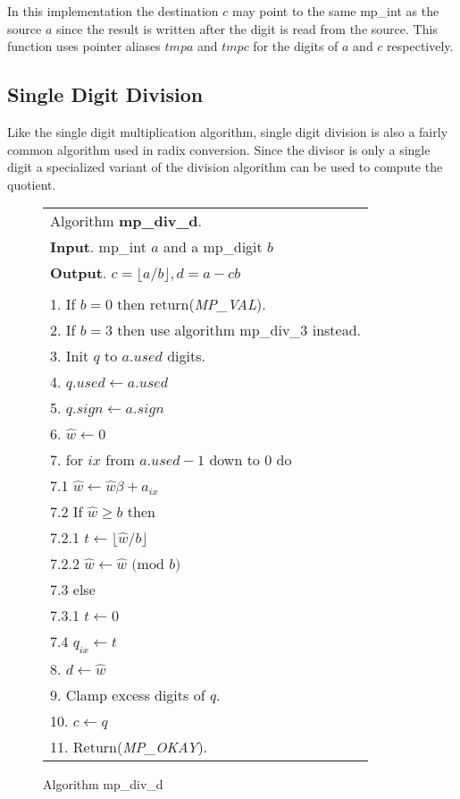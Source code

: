 \documentclass[b5paper]{book}
\begin{document}
In this implementation the destination $c$ may point to the same mp\_int as the source $a$ since the result is written after the digit is 
read from the source.  This function uses pointer aliases $tmpa$ and $tmpc$ for the digits of $a$ and $c$ respectively.  

\subsection{Single Digit Division}
Like the single digit multiplication algorithm, single digit division is also a fairly common algorithm used in radix conversion.  Since the
divisor is only a single digit a specialized variant of the division algorithm can be used to compute the quotient.  

\newpage\begin{figure}[!here]
\begin{small}
\begin{center}
\begin{tabular}{l}
\hline Algorithm \textbf{mp\_div\_d}. \\
\textbf{Input}.   mp\_int $a$ and a mp\_digit $b$ \\
\textbf{Output}.  $c = \lfloor a / b \rfloor, d = a - cb$ \\
\hline \\
1.  If $b = 0$ then return(\textit{MP\_VAL}).\\
2.  If $b = 3$ then use algorithm mp\_div\_3 instead. \\
3.  Init $q$ to $a.used$ digits.  \\
4.  $q.used \leftarrow a.used$ \\
5.  $q.sign \leftarrow a.sign$ \\
6.  $\hat w \leftarrow 0$ \\
7.  for $ix$ from $a.used - 1$ down to $0$ do \\
\hspace{3mm}7.1  $\hat w \leftarrow \hat w \beta + a_{ix}$ \\
\hspace{3mm}7.2  If $\hat w \ge b$ then \\
\hspace{6mm}7.2.1  $t \leftarrow \lfloor \hat w / b \rfloor$ \\
\hspace{6mm}7.2.2  $\hat w \leftarrow \hat w \mbox{ (mod }b\mbox{)}$ \\
\hspace{3mm}7.3  else\\
\hspace{6mm}7.3.1  $t \leftarrow 0$ \\
\hspace{3mm}7.4  $q_{ix} \leftarrow t$ \\
8.  $d \leftarrow \hat w$ \\
9.  Clamp excess digits of $q$. \\
10.  $c \leftarrow q$ \\
11.  Return(\textit{MP\_OKAY}). \\
\hline
\end{tabular}
\end{center}
\end{small}
\caption{Algorithm mp\_div\_d}
\end{figure}
\end{document}

